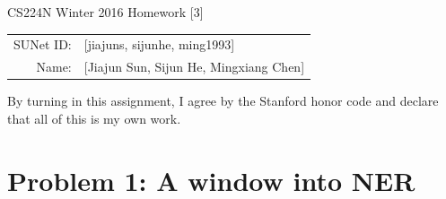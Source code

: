 \documentclass[10pt]{article}
\begin{document}
\begin{center}
{\Large CS224N Winter 2016 Homework [3]}

\begin{tabular}{rl}
SUNet ID: & [jiajuns, sijunhe, ming1993] \\
Name: & [Jiajun Sun, Sijun He, Mingxiang Chen] \\
\end{tabular}
\end{center}

By turning in this assignment, I agree by the Stanford honor code and declare
that all of this is my own work.

\section*{Problem 1: A window into NER}
\end{document}
